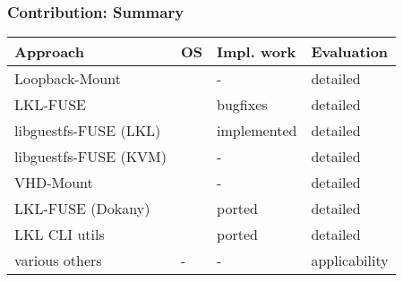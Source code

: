 

\begin{frame}

\frametitle{Contribution: Summary}

\begin{table}[htb]
    \centering
    
    \begin{tabular}{@{}m{4cm}m{1cm}m{2.5cm}m{2.2cm}@{}}
        \toprule
        \textbf{Approach}          & \textbf{OS} & \textbf{Impl. work} & \textbf{Evaluation} \\ \midrule
        Loopback-Mount             & \FAFR{}       &  -                           & detailed \\
        LKL-FUSE                   & \FAFR{}       &  bugfixes                    & detailed \\
        libguestfs-FUSE (LKL)      & \FAFR{}       &  implemented                 & detailed \\
        libguestfs-FUSE (KVM)      & \FAFR{}       &  -                           & detailed \\ \midrule
        VHD-Mount                  & \FAFR{}     &  -                           & detailed \\
        LKL-FUSE (Dokany)          & \FAFR{}     &  ported                      & detailed \\
        LKL CLI utils              & \FAFR{}     &  ported                      & detailed \\ \midrule
        various others             & -     & -                            & applicability \\
        \bottomrule
    \end{tabular}
    
\end{table}




\end{frame}
